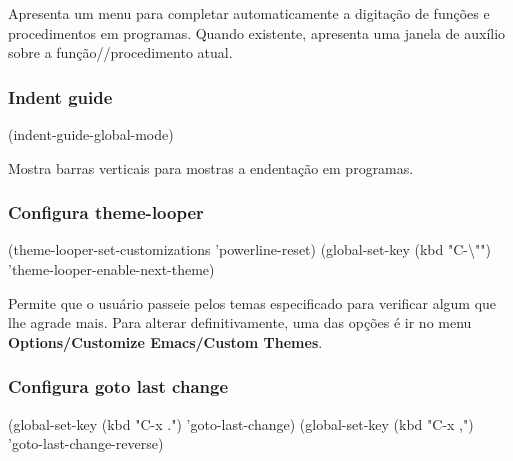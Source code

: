 \documentclass[]{article}
\newenvironment{Shaded}{}{}
\newcommand{\StringTok}[1]{\textcolor[rgb]{0.25,0.44,0.63}{{#1}}}
\newcommand{\NormalTok}[1]{{#1}}
\begin{document}
Apresenta um menu para completar automaticamente a digitação de funções
e procedimentos em programas. Quando existente, apresenta uma janela de
auxílio sobre a função//procedimento atual.

\subsubsection{Indent guide}\label{indent-guide}

\begin{Shaded}
\begin{Highlighting}[]
\NormalTok{(indent-guide-global-mode)}
\end{Highlighting}
\end{Shaded}

Mostra barras verticais para mostras a endentação em programas.

\subsubsection{Configura theme-looper}\label{configura-theme-looper}

\begin{Shaded}
\begin{Highlighting}[]
\NormalTok{(theme-looper-set-customizations 'powerline-reset)}
\NormalTok{(global-set-key (kbd }\StringTok{"C-}\NormalTok{\textbackslash{}"}\StringTok{"}\NormalTok{) 'theme-looper-enable-next-theme)}
\end{Highlighting}
\end{Shaded}

Permite que o usuário passeie pelos temas especificado para verificar
algum que lhe agrade mais. Para alterar definitivamente, uma das opções
é ir no menu \textbf{Options/Customize Emacs/Custom Themes}.

\subsubsection{Configura goto last
change}\label{configura-goto-last-change}

\begin{Shaded}
\begin{Highlighting}[]
\NormalTok{(global-set-key (kbd }\StringTok{"C-x ."}\NormalTok{) 'goto-last-change)}
\NormalTok{(global-set-key (kbd }\StringTok{"C-x ,"}\NormalTok{) 'goto-last-change-reverse)}
\end{Highlighting}
\end{Shaded}
\end{document}
